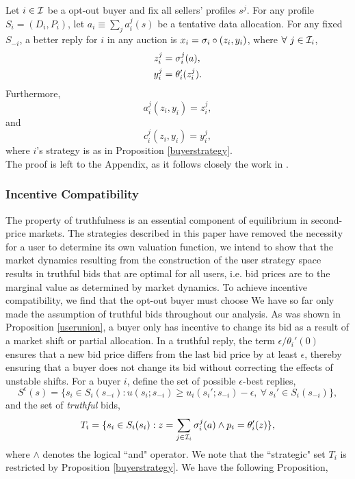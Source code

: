 {
\label{coordinationlemma} 
Let $i\in\mathcal{I}$ be a opt-out buyer and fix all sellers' profiles $s^j$.
For any profile $S_i = (D_i, P_i)$, let $a_i \equiv \sum_j a_i^j(s)$ be a
tentative data allocation. For any fixed $S_{-i}$, a better reply for $i$ in any auction is $x_i = \sigma_i \circ (z_i,y_i)$, where $\forall \ j \in \mathcal{I}_i$,
\begin{align*}
    z_i^j &= \sigma_i^{j}(a), \\
    y_i^j &= \theta_i'(z_i^j).
\end{align*}
Furthermore,
\begin{equation}\label{allocationcoordination}
    a_i^j(z_i,y_i) = z_i^{j},
\end{equation}
and
\begin{equation}\label{costcoordination}
    c_i^j(z_i,y_i) = y_i^{j},
\end{equation}
where $i$'s strategy is as in Proposition \ref{buyerstrategy}.
}\\
The proof is left to the Appendix, as it follows closely the work in
\cite{semret}.

\subsubsection{Incentive Compatibility}

The property of truthfulness is an essential component of equilibrium in
second-price markets. The strategies described in this paper have removed the
necessity for a user to determine its own valuation function, we intend to show that the market dynamics resulting from the
construction of the user strategy space results in truthful bids that are optimal for all users,
i.e. bid prices are to the marginal value as determined by market dynamics. 
To achieve incentive compatibility, we find that the opt-out buyer must choose
We have so far only made the assumption of truthful bids throughout our analysis. As was shown in Proposition \ref{userunion}, a buyer only
has incentive to change its bid as a result of a market shift or partial
allocation. In a truthful reply, the term $\epsilon/\theta_i'(0)$
ensures that a new bid price differs from the last bid price by at least
$\epsilon$, thereby ensuring that a buyer does not change its bid without
correcting the effects of unstable shifts.
For a buyer $i$, define the set of possible $\epsilon$-best replies,
\begin{equation}\label{e-bid}
    S^\epsilon(s) = \lbrace s_i\in S_i(s_{-i}) : u(s_i;s_{-i}) \ge
u_i(s_i';s_{-i}) -\epsilon, \ \forall \ s_i'\in S_i(s_{-i})\rbrace,
\end{equation}
and the set of \emph{truthful} bids, 
\begin{equation}\label{t-bid}
    T_i = \lbrace s_i\in S_i(s_i) : z=\displaystyle\sum_{j\in\mathcal{I}_i} \sigma_i^j(a)
\wedge p_i = \theta_i'(z)\rbrace,
\end{equation}
where $\wedge$ denotes the logical ``and" operator. We note that the ``strategic" set $T_i$
is restricted by Proposition \ref{buyerstrategy}.
We have the following Proposition, 

